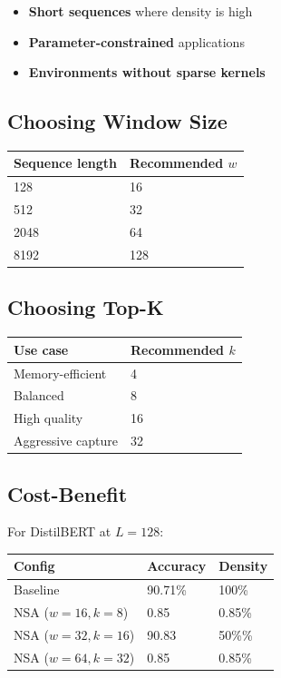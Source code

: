 \begin{itemize}
\item \textbf{Short sequences} where density is high
\item \textbf{Parameter-constrained} applications
\item \textbf{Environments without sparse kernels}

\end{itemize}
\subsection{Choosing Window Size}

\begin{table}[H]
\centering
\small
\begin{tabular}{ll}
\toprule
\textbf{Sequence length} & \textbf{Recommended $w$} \\
\midrule
128 & 16 \\
512 & 32 \\
2048 & 64 \\
8192 & 128 \\
\bottomrule
\end{tabular}
\end{table}

\subsection{Choosing Top-K}

\begin{table}[H]
\centering
\small
\begin{tabular}{ll}
\toprule
\textbf{Use case} & \textbf{Recommended $k$} \\
\midrule
Memory-efficient & 4 \\
Balanced & 8 \\
High quality & 16 \\
Aggressive capture & 32 \\
\bottomrule
\end{tabular}
\end{table}

\subsection{Cost-Benefit}

For DistilBERT at $L = 128$:

\begin{table}[H]
\centering
\small
\begin{tabular}{lll}
\toprule
\textbf{Config} & \textbf{Accuracy} & \textbf{Density} \\
\midrule
Baseline & 90.71\% & 100\% \\
NSA ($w=16, k=8$) & 0.85 & 0.85\% \\
NSA ($w=32, k=16$) & 90.83 & 50\%\% \\
NSA ($w=64, k=32$) & 0.85 & 0.85\% \\
\bottomrule
\end{tabular}
\end{table}

